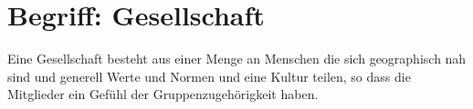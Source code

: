 \documentclass{article}
\begin{document}
\section{Begriff: Gesellschaft} 
Eine Gesellschaft besteht aus einer Menge an Menschen die sich geographisch nah sind und generell Werte und Normen und eine Kultur teilen, so dass die Mitglieder ein Gefühl der Gruppenzugehörigkeit haben.
\end{document}
